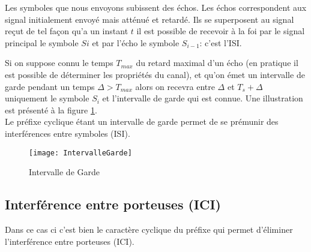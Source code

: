 Les symboles que nous envoyons subissent des échos. Les échos correspondent aux
signal initialement envoyé mais atténué et retardé. Ils se superposent au signal
reçut de tel façon qu'a un instant $t$ il est possible de recevoir à la foi par le
signal principal le symbole $Si$ et par l'écho le symbole $S_{i-1}$: c'est l'ISI.

Si on suppose connu le temps $T_{max}$ du retard maximal d'un écho (en pratique
il est possible de déterminer les propriétés du canal), et qu'on émet un
intervalle de garde pendant un temps $\Delta > T_{max}$ alors on recevra entre
$\Delta$ et $T_s+\Delta$ uniquement le symbole $S_i$ et l'intervalle de garde
qui est connue. Une illustration est présenté à la figure
\ref{fig:intervalleGarde}.
~\\

Le préfixe cyclique étant un intervalle de garde permet de se prémunir des
interférences entre symboles (ISI).



\begin{figure}[!h]
  \centering
  \texttt{[image: IntervalleGarde]}
  \caption{Intervalle de Garde}
  \label{fig:intervalleGarde}
\end{figure}

\subsection{Interférence entre porteuses (ICI)}


Dans ce cas ci c'est bien le caractère cyclique du préfixe qui permet d'éliminer
l'interférence entre porteuses (ICI).



